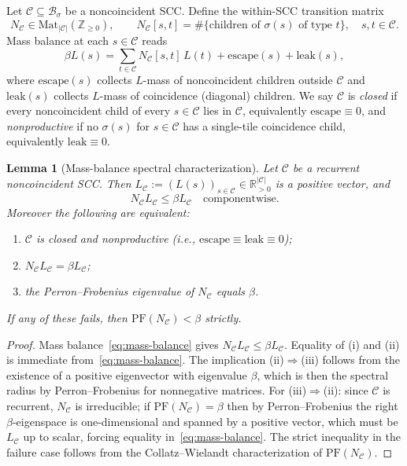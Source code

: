 \documentclass[11pt]{article}
\theoremstyle{plain}
\newtheorem{lemma}[theorem]{Lemma}
\theoremstyle{definition}
\theoremstyle{remark}
\newcommand{\Z}{\mathbb{Z}}
\newcommand{\R}{\mathbb{R}}
\newcommand{\B}{\mathcal{B}}
\newcommand{\C}{\mathcal{C}}
\newcommand{\PFroot}{\mathrm{PF}}
\begin{document}
Let $\C\subseteq\B_\sigma$ be a noncoincident SCC. Define the within-SCC transition matrix
\[
N_\C\in\mathrm{Mat}_{|\C|}(\Z_{\ge 0}),\qquad N_\C[s,t]=\#\{\text{children of }\sigma(s)\text{ of type }t\},\quad s,t\in\C.
\]
Mass balance at each $s\in\C$ reads
\begin{equation}\label{eq:mass-balance}
\beta L(s)=\sum_{t\in\C}N_\C[s,t]\,L(t)+\mathrm{escape}(s)+\mathrm{leak}(s),
\end{equation}
where $\mathrm{escape}(s)$ collects $L$-mass of noncoincident children outside $\C$ and $\mathrm{leak}(s)$ collects $L$-mass of coincidence (diagonal) children. We say $\C$ is \emph{closed} if every noncoincident child of every $s\in\C$ lies in $\C$, equivalently $\mathrm{escape}\equiv 0$, and \emph{nonproductive} if no $\sigma(s)$ for $s\in\C$ has a single-tile coincidence child, equivalently $\mathrm{leak}\equiv 0$.

\begin{lemma}[Mass-balance spectral characterization]\label{lem:mass-balance}
Let $\C$ be a recurrent noncoincident SCC. Then $L_\C:=(L(s))_{s\in\C}\in\R^{|\C|}_{>0}$ is a positive vector, and
\[
N_\C L_\C\le\beta L_\C\quad\text{componentwise}.
\]
Moreover the following are equivalent:
\begin{enumerate}[label=(\roman*)]
\item $\C$ is closed and nonproductive (i.e., $\mathrm{escape}\equiv\mathrm{leak}\equiv 0$);
\item $N_\C L_\C=\beta L_\C$;
\item the Perron--Frobenius eigenvalue of $N_\C$ equals $\beta$.
\end{enumerate}
If any of these fails, then $\PFroot(N_\C)<\beta$ strictly.
\end{lemma}

\begin{proof}
Mass balance~\eqref{eq:mass-balance} gives $N_\C L_\C\le\beta L_\C$. Equality of (i) and (ii) is immediate from~\eqref{eq:mass-balance}. The implication (ii)$\Rightarrow$(iii) follows from the existence of a positive eigenvector with eigenvalue $\beta$, which is then the spectral radius by Perron--Frobenius for nonnegative matrices. For (iii)$\Rightarrow$(ii): since $\C$ is recurrent, $N_\C$ is irreducible; if $\PFroot(N_\C)=\beta$ then by Perron--Frobenius the right $\beta$-eigenspace is one-dimensional and spanned by a positive vector, which must be $L_\C$ up to scalar, forcing equality in~\eqref{eq:mass-balance}. The strict inequality in the failure case follows from the Collatz--Wielandt characterization of $\PFroot(N_\C)$.
\end{proof}
\end{document}

